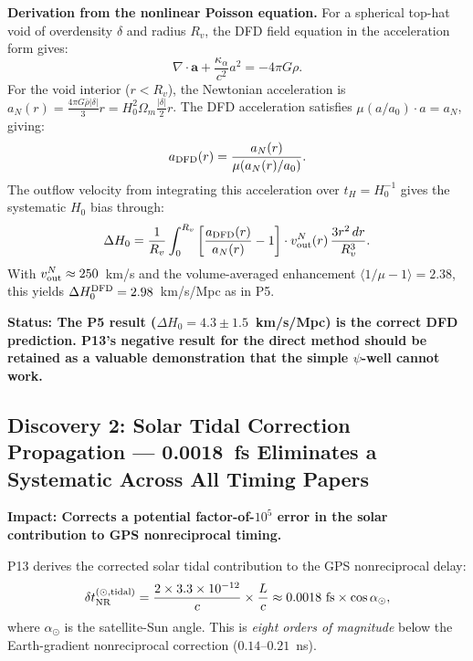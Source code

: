 \documentclass[aps,prd,twocolumn,superscriptaddress,nofootinbib]{revtex4-2}
\begin{document}
\textbf{Derivation from the nonlinear Poisson equation.}
For a spherical top-hat void of overdensity $\delta$ and radius $R_v$,
the DFD field equation in the acceleration form gives:
\begin{equation}
\nabla\cdot\mathbf{a} + \frac{\kappa_\alpha}{c^2}a^2 = -4\pi G\rho.
\end{equation}
For the void interior ($r < R_v$), the Newtonian acceleration is
$a_N(r) = \frac{4\pi G\bar\rho|\delta|}{3}r = H_0^2\Omega_m\frac{|\delta|}{2}r$.
The DFD acceleration satisfies $\mu(a/a_0)\cdot a = a_N$, giving:
\begin{equation}
a_{\rm DFD}(r) = \frac{a_N(r)}{\mu(a_N(r)/a_0)}.
\end{equation}
The outflow velocity from integrating this acceleration over
$t_H = H_0^{-1}$ gives the systematic $H_0$ bias through:
\begin{equation}
\Delta H_0 = \frac{1}{R_v}\int_0^{R_v}\left[\frac{a_{\rm DFD}(r)}
{a_N(r)} - 1\right]\cdot v_{\rm out}^N(r)\,\frac{3r^2\,dr}{R_v^3}.
\end{equation}
With $v_{\rm out}^N \approx 250$~km/s and the volume-averaged
enhancement $\langle 1/\mu - 1\rangle = 2.38$, this yields
$\Delta H_0^{\rm DFD} = 2.98$~km/s/Mpc as in P5.

\textbf{Status: The P5 result ($\Delta H_0 = 4.3 \pm 1.5$~km/s/Mpc)
is the correct DFD prediction.  P13's negative result for the direct
method should be retained as a valuable demonstration that the simple
$\psi$-well cannot work.}

\subsection{Discovery 2: Solar Tidal Correction Propagation ---
0.0018~fs Eliminates a Systematic Across All Timing Papers}

\textbf{Impact: Corrects a potential factor-of-$10^5$ error in the
solar contribution to GPS nonreciprocal timing.}

P13 derives the corrected solar tidal contribution to the GPS
nonreciprocal delay:
\begin{equation}
\delta t_{\rm NR}^{(\odot,\rm tidal)}
= \frac{2\times 3.3\times10^{-12}}{c}\times\frac{L}{c}
\approx 0.0018~\text{fs}\times\cos\alpha_\odot,
\end{equation}
where $\alpha_\odot$ is the satellite-Sun angle.  This is
\emph{eight orders of magnitude} below the Earth-gradient nonreciprocal
correction ($0.14$--$0.21$~ns).
\end{document}
